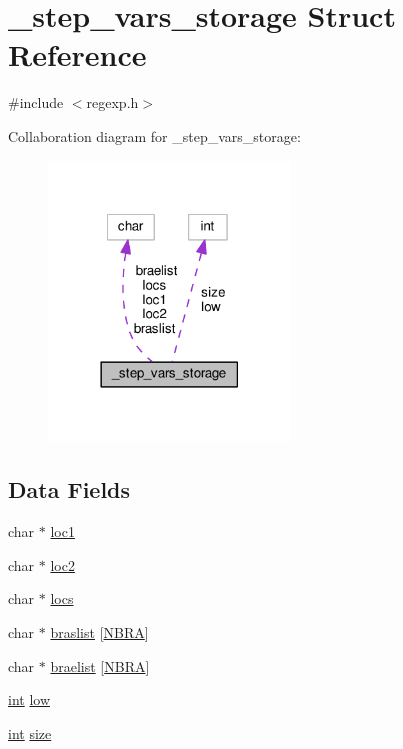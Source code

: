 \hypertarget{struct__step__vars__storage}{}\section{\+\_\+step\+\_\+vars\+\_\+storage Struct Reference}
\label{struct__step__vars__storage}


{\ttfamily \#include $<$regexp.\+h$>$}



Collaboration diagram for \+\_\+step\+\_\+vars\+\_\+storage\+:
\nopagebreak
\begin{figure}[H]
\begin{center}
\leavevmode
\includegraphics[width=182pt]{struct__step__vars__storage__coll__graph}
\end{center}
\end{figure}
\subsection*{Data Fields}
\begin{DoxyCompactItemize}
\item 
char $\ast$ \hyperlink{struct__step__vars__storage_a780c9cc2d142cbd9c48b6ec052554cb3}{loc1}
\item 
char $\ast$ \hyperlink{struct__step__vars__storage_a706efd651f9ed759d692b37a22d87e1d}{loc2}
\item 
char $\ast$ \hyperlink{struct__step__vars__storage_afcf295bdc236d6ed622674ab0052391b}{locs}
\item 
char $\ast$ \hyperlink{struct__step__vars__storage_af014f50c684365d16c0d6436274aac74}{braslist} \mbox{[}\hyperlink{regexp_8h_a134ce5560a37eca1ccda53f71cbffc22}{N\+B\+RA}\mbox{]}
\item 
char $\ast$ \hyperlink{struct__step__vars__storage_a2cfce0e1f92a38369eb6378a1b7516ec}{braelist} \mbox{[}\hyperlink{regexp_8h_a134ce5560a37eca1ccda53f71cbffc22}{N\+B\+RA}\mbox{]}
\item 
\hyperlink{pcre_8txt_a42dfa4ff673c82d8efe7144098fbc198}{int} \hyperlink{struct__step__vars__storage_a22668c96f153818834a61a2350ad7e69}{low}
\item 
\hyperlink{pcre_8txt_a42dfa4ff673c82d8efe7144098fbc198}{int} \hyperlink{struct__step__vars__storage_a1e561032df1d11195acbb7470b159ec4}{size}
\end{DoxyCompactItemize}



